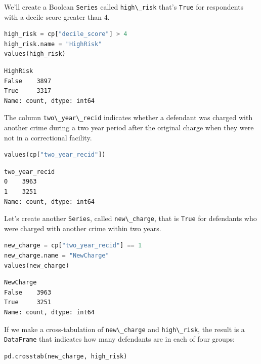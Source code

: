 We'll create a Boolean \passthrough{\lstinline!Series!} called
\passthrough{\lstinline!high\_risk!} that's
\passthrough{\lstinline!True!} for respondents with a decile score
greater than 4.

\begin{lstlisting}[language=Python,style=source]
high_risk = cp["decile_score"] > 4
high_risk.name = "HighRisk"
values(high_risk)
\end{lstlisting}

\begin{lstlisting}[style=output]
HighRisk
False    3897
True     3317
Name: count, dtype: int64
\end{lstlisting}

The column \passthrough{\lstinline!two\_year\_recid!} indicates whether
a defendant was charged with another crime during a two year period
after the original charge when they were not in a correctional facility.

\begin{lstlisting}[language=Python,style=source]
values(cp["two_year_recid"])
\end{lstlisting}

\begin{lstlisting}[style=output]
two_year_recid
0    3963
1    3251
Name: count, dtype: int64
\end{lstlisting}

Let's create another \passthrough{\lstinline!Series!}, called
\passthrough{\lstinline!new\_charge!}, that is
\passthrough{\lstinline!True!} for defendants who were charged with
another crime within two years.

\begin{lstlisting}[language=Python,style=source]
new_charge = cp["two_year_recid"] == 1
new_charge.name = "NewCharge"
values(new_charge)
\end{lstlisting}

\begin{lstlisting}[style=output]
NewCharge
False    3963
True     3251
Name: count, dtype: int64
\end{lstlisting}

If we make a cross-tabulation of \passthrough{\lstinline!new\_charge!}
and \passthrough{\lstinline!high\_risk!}, the result is a
\passthrough{\lstinline!DataFrame!} that indicates how many defendants
are in each of four groups:

\begin{lstlisting}[language=Python,style=source]
pd.crosstab(new_charge, high_risk)
\end{lstlisting}

